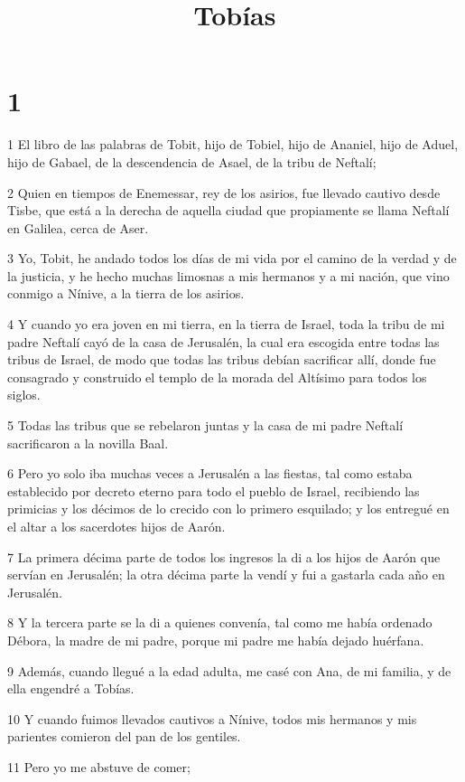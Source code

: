 

\title{Tobías}


\chapter{1}

\par 1 El libro de las palabras de Tobit, hijo de Tobiel, hijo de Ananiel, hijo de Aduel, hijo de Gabael, de la descendencia de Asael, de la tribu de Neftalí;
\par 2 Quien en tiempos de Enemessar, rey de los asirios, fue llevado cautivo desde Tisbe, que está a la derecha de aquella ciudad que propiamente se llama Neftalí en Galilea, cerca de Aser.
\par 3 Yo, Tobit, he andado todos los días de mi vida por el camino de la verdad y de la justicia, y he hecho muchas limosnas a mis hermanos y a mi nación, que vino conmigo a Nínive, a la tierra de los asirios.
\par 4 Y cuando yo era joven en mi tierra, en la tierra de Israel, toda la tribu de mi padre Neftalí cayó de la casa de Jerusalén, la cual era escogida entre todas las tribus de Israel, de modo que todas las tribus debían sacrificar allí, donde fue consagrado y construido el templo de la morada del Altísimo para todos los siglos.
\par 5 Todas las tribus que se rebelaron juntas y la casa de mi padre Neftalí sacrificaron a la novilla Baal.
\par 6 Pero yo solo iba muchas veces a Jerusalén a las fiestas, tal como estaba establecido por decreto eterno para todo el pueblo de Israel, recibiendo las primicias y los décimos de lo crecido con lo primero esquilado; y los entregué en el altar a los sacerdotes hijos de Aarón.
\par 7 La primera décima parte de todos los ingresos la di a los hijos de Aarón que servían en Jerusalén; la otra décima parte la vendí y fui a gastarla cada año en Jerusalén.
\par 8 Y la tercera parte se la di a quienes convenía, tal como me había ordenado Débora, la madre de mi padre, porque mi padre me había dejado huérfana.
\par 9 Además, cuando llegué a la edad adulta, me casé con Ana, de mi familia, y de ella engendré a Tobías.
\par 10 Y cuando fuimos llevados cautivos a Nínive, todos mis hermanos y mis parientes comieron del pan de los gentiles.
\par 11 Pero yo me abstuve de comer;
